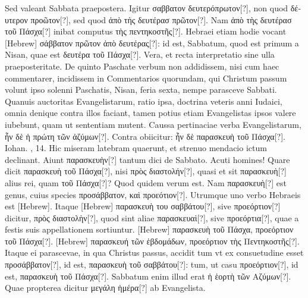 Sed valeant Sabbata praepostera.
Igitur \textgreek{σαββατον δευτερόπρωτον[?]},
 non quod \textgreek{δέυτερον προῶτον[?]}, sed
quod \textgreek{ἀπὸ τὴς δευτέρασ πρῶτον[?]}.
Nam \textgreek{ἀπὸ τὴς δευτέρασ τοῦ Πάσχα[?]} inibat
computus \textgreek{τὴς πεντηκοστῆς[?]}.
Hebraei etiam hodie vocant \texthebrew{[Hebrew]}
\textgreek{σάββατον πρῶτον ἀπὸ δευτέρας[?]}: id est, Sabbatum, quod est primum a
 Nisan, quae est \textgreek{δευτέρα τοῦ Πάσχα[?]}.
Vera, et recta interpretatio sine ulla praeposteritate.
De quinto Paschate verbum non addidissem,
nisi cum haec commentarer, incidissem in Commentarios quorundam,
qui Christum passum volunt ipso solenni Paschatis, 
Nisan, feria sexta, nempe parasceve Sabbati.
Quanuis auctoritas
Evangelistarum, ratio ipsa, doctrina veteris anni Iudaici, omnia
denique contra illos faciant, tamen potius etiam Evangelistas ipsos
valere iubebunt, quam ut sententiam mutent.
Caussa pertinaciae
verba Evangelistarum, \textgreek{ἦν δὲ ἡ πρώτη τῶν ἀζύμων[?]}.
Contra obiicitur:
\textgreek{ἦν δὲ παρασκευὴ τοῦ Πάσχα[?]}.
Iohan. , 14.
Hic miseram latebram quaerunt,
et strenuo mendacio ictum declinant.
Aiunt \textgreek{παρασκευὴν[?]} tantum
dici de Sabbato.
Acuti homines!
Quare dicit \textgreek{παρασκευὴ τοῦ Πάσχα[?]},
nisi \textgreek{πρὸς διαστολήν[?]}, quasi et sit \textgreek{παρασκευὴ[?]}
 alius rei, quam \textgreek{τοῦ Πάσχα[?]}?
Quod quidem verum est.
Nam \textgreek{παρασκευὴ[?]} est genus, cuius species
\textgreek{προσάββατον, καὶ προεότιον[?]}.
Utrumque uno verbo Hebraeis est
\texthebrew{[Hebrew]}.
Itaque \texthebrew{[Hebrew]} \textgreek{παρασκευὴ του σαββάτου[?]},
 sive \textgreek{προεόρτιον[?]} dicitur,
\textgreek{πρὸς διαστολὴν[?]}, quod sint aliae \textgreek{παρασκευαὶ[?]},
 sive \textgreek{προεόρτια[?]}, quae a festis
suis appellationem sortiuntur.
\texthebrew{[Hebrew]} \textgreek{παρασκευὴ τοῦ Πάσχα, προεόρτιον
τοῦ Πάσχα[?]}.
\texthebrew{[Hebrew]}
 \textgreek{παρασκευή τῶν ἑβδομάδων, προεόρτιον τὴς Πεντηκοστῆς[?]}.
Itaque ei parascevae, in qua Christus passus, accidit tum
vt ex consuetudine esset \textgreek{προσάββατον[?]}, id est,
 \textgreek{παρασκευὴ τοῦ σαββάτου[?]}:
tum, ut casu \textgreek{προεόρτιον[?]}, id est,
 \textgreek{παρασκευὴ τοῦ Πάσχα[?]}.
Sabbatum enim
illud erat \textgreek{ἡ ἑορτὴ τῶν Αζύμων[?]}.
Quae propterea dicitur \textgreek{μεγάλη ἡμέρα[?]}
ab Evangelista.
